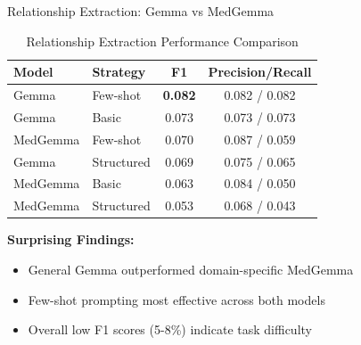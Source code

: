 \documentclass[aspectratio=169, 11pt]{beamer}
\begin{document}
\begin{frame}{Relationship Extraction: Gemma vs MedGemma}
    \vspace{0.3cm}
    \begin{table}[h]
        \centering
        \footnotesize
        \caption{Relationship Extraction Performance Comparison}
        \begin{tabular}{llcc}
        \toprule
        \textbf{Model} & \textbf{Strategy} & \textbf{F1} & \textbf{Precision/Recall} \\
        \midrule
        \textcolor{ulgreen}{Gemma} & \textcolor{ulgreen}{Few-shot} & \textcolor{ulgreen}{\textbf{0.082}} & 0.082 / 0.082 \\
        Gemma & Basic & 0.073 & 0.073 / 0.073 \\
        MedGemma & Few-shot & 0.070 & 0.087 / 0.059 \\
        Gemma & Structured & 0.069 & 0.075 / 0.065 \\
        MedGemma & Basic & 0.063 & 0.084 / 0.050 \\
        MedGemma & Structured & 0.053 & 0.068 / 0.043 \\
        \bottomrule
        \end{tabular}
    \end{table}
    
    \vspace{0.4cm}
    \textbf{Surprising Findings:}
    \begin{itemize}
        \setlength{\itemsep}{0.3cm}
        \item General Gemma outperformed domain-specific MedGemma
        \item Few-shot prompting most effective across both models
        \item Overall low F1 scores (5-8\%) indicate task difficulty
    \end{itemize}
\end{frame}
\end{document}
